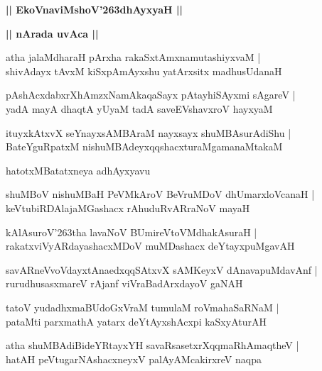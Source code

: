 \documentclass[twoside,12pt,openright]{book}
\def\S{\char'263}
\newcounter{shloka}[chapter]
\def\uvaca#1{\centerline{{\large\textbf{#1}}}}
\begin{document}
\begin{center}
{\LARGE\bfseries  || EkoVnaviMshoV\S dhAyxyaH ||}
\end{center}	

\uvaca{|| nArada uvAca ||}

\begin{shloka}%
atha jalaMdharaH pArxha rakaSxtAmxnamutashiyxvaM |\\
shivAdayx tAvxM kiSxpAmAyxshu yatArxsitx madhusUdanaH
\end{shloka}

\begin{shloka}%
pAshAcxdabxrXhAmzxNamAkaqaSayx pAtayhiSAyxmi sAgareV |\\
yadA mayA dhaqtA yUyaM tadA saveEVshavxroV hayxyaM 
\end{shloka}

\begin{shloka}%
ituyxkAtxvX seYnayxsAMBAraM nayxsayx shuMBAsurAdiShu |\\
BateYguRpatxM nishuMBAdeyxqqshacxturaMgamanaMtakaM
\end{shloka}

\begin{center}
hatotxMBatatxneya adhAyxyavu
\end{center}

\begin{shloka}%
shuMBoV nishuMBaH PeVMkAroV BeVruMDoV dhUmarxloVcanaH |\\
keVtubiRDAlajaMGashacx rAhuduRvARraNoV mayaH 
\end{shloka}

\begin{shloka}%
kAlAsuroV\S tha lavaNoV BUmireVtoVMdhakAsuraH |\\
rakatxviVyARdayashacxMDoV muMDashacx deYtayxpuMgavAH 
\end{shloka}

\begin{shloka}%
savARneVvoVdayxtAnaedxqqSAtxvX sAMKeyxV dAnavapuMdavAnf |\\
rurudhusasxmareV rAjanf viVraBadArxdayoV gaNAH
\end{shloka}

\begin{shloka}%
tatoV yudadhxmaBUdoGxVraM tumulaM roVmahaSaRNaM |\\
pataMti parxmathA yatarx deYtAyxshAcxpi kaSxyAturAH 
\end{shloka}

\begin{shloka}%
atha shuMBAdiBideYRtayxYH savaRsasetxrXqqmaRhAmaqtheV |\\
hatAH peVtugarNAshacxneyxV palAyAMcakirxreV naqpa 
\end{shloka}
\end{document}
